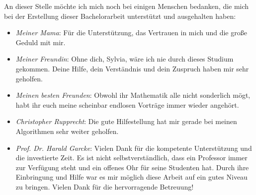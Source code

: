 \begin{large}
An dieser Stelle möchte ich mich noch bei einigen Menschen bedanken, die mich bei der Erstellung dieser Bachelorarbeit unterstützt und ausgehalten haben:
\begin{itemize}
\item \textit{Meiner Mama}: Für die Unterstützung, das Vertrauen in mich und die große Geduld mit mir.
\item \textit{Meiner Freundin}: Ohne dich, Sylvia, wäre ich nie durch dieses Studium gekommen. Deine Hilfe, dein Verständnis und dein Zuspruch haben mir sehr geholfen.
\item \textit{Meinen besten Freunden}: Obwohl ihr Mathematik alle nicht sonderlich mögt, habt ihr euch meine scheinbar endlosen Vorträge immer wieder angehört.
\item \textit{Christopher Rupprecht}: Die gute Hilfestellung hat mir gerade bei meinen Algorithmen sehr weiter geholfen.
\item \textit{Prof. Dr. Harald Garcke}:  Vielen Dank für die kompetente Unterstützung und die investierte Zeit. Es ist nicht selbstverständlich, dass ein Professor immer zur Verfügung steht und ein offenes Ohr für seine Studenten hat. Durch ihre Einbringung und Hilfe war es mir möglich diese Arbeit auf ein gutes Niveau zu bringen. Vielen Dank für die hervorragende Betreuung!
\end{itemize}
\end{large}

